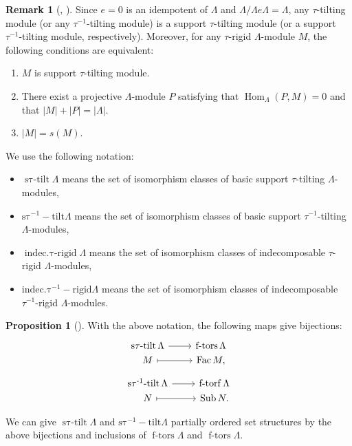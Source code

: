 \documentclass[pdftex,a4paper]{article}
\numberwithin{equation}{subsection}
\theoremstyle{definition}
\newtheorem{proposition}[theorem]{Proposition}
\newtheorem{remark}[theorem]{Remark}
\newcommand{\Hom}{\operatorname{Hom}\nolimits}
\newcommand{\stautilt}{\operatorname{\mathrm{s\tau-tilt}}}
\newcommand{\itaurigid}{\operatorname{\mathrm{indec.\tau-rigid}}}
\newcommand{\itauirigid}{\operatorname{\mathrm{indec.\tau^{-1}-rigid}}}
\newcommand{\stauitilt}{\operatorname{\mathrm{s\tau^{-1}-tilt}}}
\newcommand{\ftors}{\operatorname{\mathrm{f-tors}}}
\newcommand{\ftorf}{\operatorname{\mathrm{f-torf}}}
\newcommand{\Fac}{\operatorname{\mathrm{Fac}}}
\newcommand{\Sub}{\operatorname{\mathrm{Sub}}}
\begin{document}
\begin{remark}[{\cite[Proposition 2.3 (a), (b)]{MR3848421}, \cite[Proposition 1.8]{MR3461065}}]\label{tau number remark 2021-09-07 12:11:53}
	Since \(e=0\) is an idempotent of \(\Lambda\) and \(\Lambda/\Lambda e\Lambda =\Lambda\), any \(\tau\)-tilting module (or any \(\tau^{-1}\)-tilting module) is a support \(\tau\)-tilting module (or a support \(\tau^{-1}\)-tilting module, respectively).
	Moreover, for any \(\tau\)-rigid \(\Lambda\)-module \(M\), the following conditions are equivalent:
	\begin{enumerate}
		\item \(M\) is support \(\tau\)-tilting module.
		\item There exist a projective \(\Lambda\)-module \(P\) satisfying that \(\Hom_\Lambda(P,M)=0\) and that \(|M|+|P|=|\Lambda|\).
		\item \(|M|=s(M)\).
	\end{enumerate}
\end{remark}

We use the following notation:
\begin{itemize}
	\item \(\stautilt \Lambda\) means the set of isomorphism classes of basic support \(\tau\)-tilting \(\Lambda\)-modules,
	\item \(\stauitilt \Lambda\) means the set of isomorphism classes of basic support \(\tau^{-1}\)-tilting \(\Lambda\)-modules,
	\item \(\itaurigid \Lambda\) means the set of isomorphism classes of indecomposable \(\tau\)-rigid \(\Lambda\)-modules,
	\item  \(\itauirigid \Lambda\) means the set of isomorphism classes of indecomposable \(\tau^{-1}\)-rigid \(\Lambda\)-modules.
\end{itemize}
\begin{proposition}[{\cite[Theorem 2.7, Theorem 2.15]{MR3187626}}]\label{2020/08/31}
	With the above notation, the following maps give bijections:
	\begin{equation}\label{fac}
		\begin{tikzcd}[row sep=1pt]
			\stautilt \Lambda \ar[r] &\ftors \Lambda\\
			M \ar[r,mapsto]& \Fac M,
		\end{tikzcd}
	\end{equation}
	\begin{equation}\label{sub}
		\begin{tikzcd}[row sep=1pt]
			\stauitilt \Lambda \ar[r] &\ftorf \Lambda\\
			N \ar[r,mapsto]& \Sub N.
		\end{tikzcd}
	\end{equation}
\end{proposition}
We can give \(\stautilt \Lambda\) and \(\stauitilt \Lambda\) partially ordered set structures by the above bijections and inclusions of \(\ftors \Lambda\) and \(\ftors \Lambda\).
\end{document}
